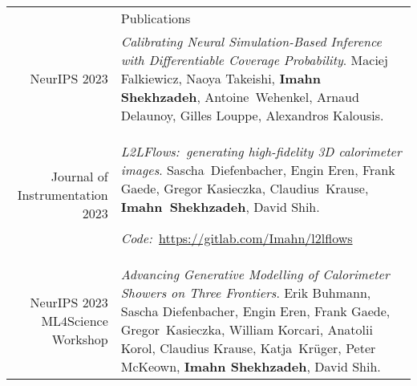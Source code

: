 \documentclass[11pt, a4paper]{article}
\newcommand{\headingfont}{\Large\color{OliveGreen}}
\newenvironment{SectionTable}[1]{
	\renewcommand*{\arraystretch}{1.7}
	\setlength{\tabcolsep}{10pt}
	\begin{longtable}{Rp{5.2in}} & #1 \\}
	{\end{longtable}\vspace{-.3cm}}
\begin{document}
	\begin{SectionTable}{\headingfont Publications} 
        NeurIPS 2023 & \textit{Calibrating Neural Simulation-Based Inference with Differentiable Coverage Probability}. 
        Maciej Falkiewicz, Naoya Takeishi, \textbf{Imahn Shekhzadeh}, \mbox{Antoine Wehenkel}, Arnaud Delaunoy, Gilles Louppe, 
        Alexandros Kalousis. \\

        Journal of \mbox{Instrumentation} 2023 & \textit{L2LFlows:~generating high-fidelity 3D calorimeter images}.
        \mbox{Sascha Diefenbacher}, Engin Eren, Frank Gaede, Gregor Kasieczka, \mbox{Claudius Krause}, \mbox{\textbf{Imahn Shekhzadeh}}, David Shih. 
        
        \textit{Code:}~\url{https://gitlab.com/Imahn/l2lflows} \\

        NeurIPS 2023 ML$4$Science Workshop & \textit{Advancing Generative Modelling of Calorimeter Showers on Three Frontiers}.
        Erik Buhmann, Sascha Diefenbacher, Engin Eren, Frank Gaede, \mbox{Gregor Kasieczka}, William Korcari, Anatolii Korol, 
        Claudius Krause, \mbox{Katja Krüger}, Peter McKeown, \textbf{Imahn Shekhzadeh}, David Shih. \\[18pt]
        
	\end{SectionTable}
	
	\newpage 
\end{document}
